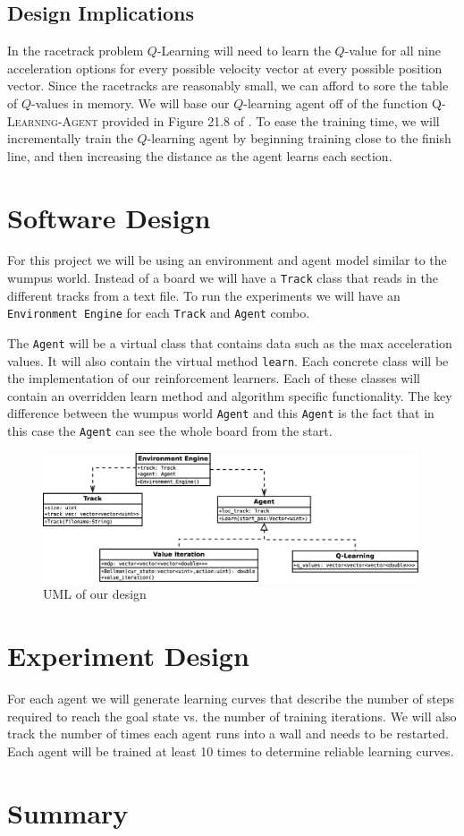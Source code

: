 \documentclass{article}
\begin{document}
		\subsection{Design Implications}
			In the racetrack problem $Q$-Learning will need to learn the $Q$-value for all nine acceleration options for every possible velocity vector at every possible position vector.
			Since the racetracks are reasonably small, we can afford to sore the table of $Q$-values in memory. We will base our $Q$-learning agent off of the function \textsc{Q-Learning-Agent} provided in Figure 21.8 of \cite{ai}. To ease the training time, we will incrementally train the $Q$-learning agent by beginning training close to the finish line, and then increasing the distance as the agent learns each section.
	\section{Software Design}
	For this project we will be using an environment and agent model similar to the wumpus world. Instead of a board we will have a \texttt{Track} class that reads in the different tracks from a text file. To run the experiments we will have an \texttt{Environment Engine} for each \texttt{Track} and \texttt{Agent} combo. 
	
	The \texttt{Agent} will be a virtual class that contains data such as the max acceleration values. It will also contain the virtual method \texttt{learn}. Each concrete class will be the implementation of our reinforcement learners. Each of these classes will contain an overridden learn method and algorithm specific functionality. The key difference between the wumpus world \texttt{Agent} and this \texttt{Agent} is the fact that in this case the \texttt{Agent} can see the whole board from the start.
	\begin{figure}[h!]
		\centering
		\includegraphics[width=0.99\textwidth]{Diagrams/uml}
		\caption{UML of our design}
	\end{figure}
	\section{Experiment Design}
		 For each agent we will generate learning curves that describe the number of steps required to reach the goal state vs. the number of training iterations. We will also track the number of times each agent runs into a wall and needs to be restarted. Each agent will be trained at least 10 times to determine reliable learning curves.
	\section{Summary}

		
	
\end{document}
